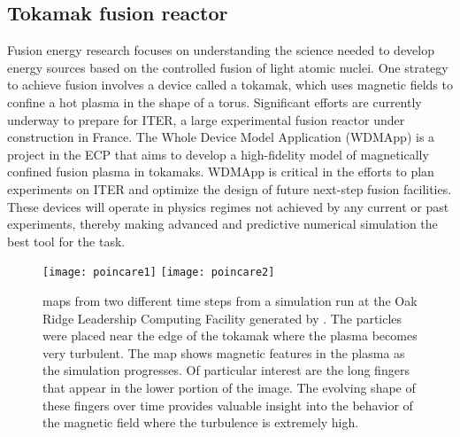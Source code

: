 \subsection{Tokamak fusion reactor}


Fusion energy research focuses on understanding the science needed to develop energy sources based on the controlled fusion of light atomic nuclei. One strategy to achieve fusion involves a device called a tokamak, which uses magnetic fields to confine a hot plasma in the shape of a torus.
Significant efforts are currently underway to prepare for ITER, a large experimental fusion reactor under construction in France.
The Whole Device Model Application (WDMApp) is a project in the ECP that aims to develop a high-fidelity model of magnetically confined fusion plasma in tokamaks. 
WDMApp is critical in the efforts to plan experiments on ITER and optimize the design of future next-step fusion facilities. These devices will operate in physics regimes not achieved by any current or past experiments, thereby making advanced and predictive numerical simulation the best tool for the task.




\begin{figure*}[tb]
  \centering
  \texttt{[image: poincare1]}
  \texttt{[image: poincare2]}
  \caption{\poincare maps from two different time steps from a simulation run at the Oak Ridge Leadership Computing Facility generated by \vtkm.  The particles were placed near the edge of the tokamak where the plasma becomes very turbulent. The \poincare map shows magnetic features in the plasma as the simulation progresses. Of particular interest are the long fingers that appear in the lower portion of the image. The evolving shape of these fingers over time provides valuable insight into the behavior of the magnetic field where the turbulence is extremely high. }
  \label{fig:poincare}
\end{figure*}

